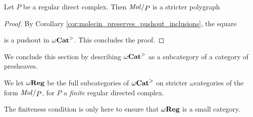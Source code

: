 \begin{lem} \label{lem:stricter_regular_complex_are_stricter_polygraph}
    Let \( P \) be a regular direct complex.
    Then \( \molecin{P} \) is a stricter polygraph
\end{lem}
\begin{proof}
    By Corollary \ref{cor:molecin_preserves_pushout_inclusions}, the square
    \begin{center}
    \end{center}
    is a pushout in \( {\omega\mathbf{Cat}}^> \).
    This concludes the proof.
\end{proof}

\noindent We conclude this section by describing \( {\omega\mathbf{Cat}}^> \) as a subcategory of a category of presheaves.

\begin{dfn}
    We let \( \omega\mathbf{Reg} \) be the full subcategories of \( {\omega\mathbf{Cat}}^> \) on stricter \( \omega \)\nbd categories of the form \( \molecin{P} \), for \( P \) a \emph{finite} regular directed complex.
\end{dfn}

\begin{comm}
    The finiteness condition is only here to ensure that \( \omega\mathbf{Reg} \) is a small category. 
\end{comm}

